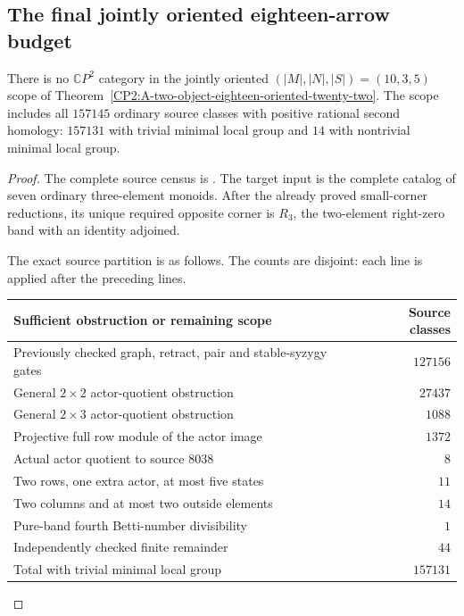 \subsection{The final jointly oriented eighteen-arrow budget}

\begin{theorem}
\label{CP2:A-oriented-eighteen-ten-three-five}
There is no $\mathbb CP^2$ category in the jointly oriented
$(|M|,|N|,|S|)=(10,3,5)$ scope of
Theorem~\ref{CP2:A-two-object-eighteen-oriented-twenty-two}.
The scope includes all $157145$ ordinary source classes with positive
rational second homology: $157131$ with trivial minimal local group
and $14$ with nontrivial minimal local group.
\end{theorem}
\begin{proof}
The complete source census is
.
The target input is the complete catalog of seven ordinary
three-element monoids.  After the already proved small-corner
reductions, its unique required opposite corner is $R_3$, the
two-element right-zero band with an identity adjoined.

The exact source partition is as follows.  The counts are disjoint:
each line is applied after the preceding lines.
\begin{center}
\begin{tabular}{lr}
\hline
Sufficient obstruction or remaining scope & Source classes\\
\hline
Previously checked graph, retract, pair and stable-syzygy gates & $127156$\\
General $2\times2$ actor-quotient obstruction & $27437$\\
General $2\times3$ actor-quotient obstruction & $1088$\\
Projective full row module of the actor image & $1372$\\
Actual actor quotient to source $8038$ & $8$\\
Two rows, one extra actor, at most five states & $11$\\
Two columns and at most two outside elements & $14$\\
Pure-band fourth Betti-number divisibility & $1$\\
Independently checked finite remainder & $44$\\
\hline
Total with trivial minimal local group & $157131$\\
\hline
\end{tabular}
\end{center}


\end{proof}

